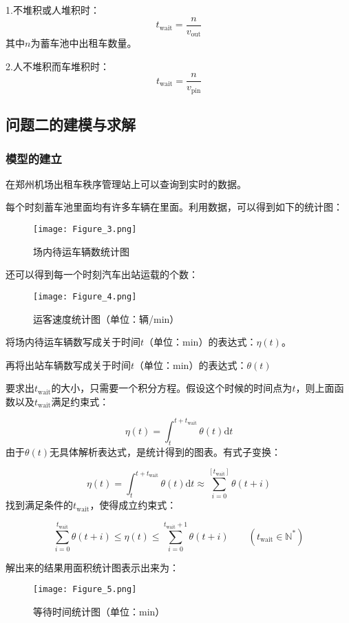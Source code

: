 \documentclass[withoutpreface,bwprint]{cumcmthesis} %
\begin{document}
1.不堆积或人堆积时：
\begin{equation}
	t_{\mathrm{wait}}=\frac{n}{v_{\mathrm{out}}}
\end{equation}
其中$n$为蓄车池中出租车数量。

2.人不堆积而车堆积时：
\begin{equation}
	t_{\mathrm{wait}}=\frac{n}{v_{\mathrm{pin}}}
\end{equation}

\newpage
\subsection{问题二的建模与求解}
\subsubsection{模型的建立}

在郑州机场出租车秩序管理站上可以查询到实时的数据。\par
每个时刻蓄车池里面均有许多车辆在里面。利用数据，可以得到如下的统计图：\par
\begin{figure}[!h]
	\centering
	\texttt{[image: Figure\_3.png]}
	\caption{场内待运车辆数统计图}
\end{figure}
还可以得到每一个时刻汽车出站运载的个数：\par
\begin{figure}[!h]
	\centering
	\texttt{[image: Figure\_4.png]}
	\caption{运客速度统计图（单位：辆/min）}
\end{figure}

将场内待运车辆数写成关于时间$t$（单位：min）的表达式：$\eta(t)$。\par
再将出站车辆数写成关于时间$t$（单位：min）的表达式：$\theta(t)$\par
要求出$t_{\mathrm{wait}}$的大小，只需要一个积分方程。假设这个时候的时间点为$t$，则上面函数以及$t_{\mathrm{wait}}$满足约束式：\par
\begin{equation}
	\eta(t)=\int_{t}^{t+t_{\mathrm{wait}}}\theta(t)\mathrm dt
\end{equation}
由于$\theta(t)$无具体解析表达式，是统计得到的图表。有式子变换：\par
\begin{equation}
	\eta(t)=\int_{t}^{t+t_{\mathrm{wait}}}\theta(t)\mathrm dt\approx \sum_{i=0}^{[t_{\mathrm{wait}}]}{\theta(t+i)}
\end{equation}
找到满足条件的$t_{\mathrm{wait}}$，使得成立约束式：\par
\begin{equation}
	\sum_{i=0}^{t_{\mathrm{wait}}}{\theta(t+i)}\leq\eta(t) \leq\sum_{i=0}^{t_{\mathrm{wait}}+1}{\theta(t+i)}\quad\quad ( t_{\mathrm{wait}}\in \mathbb{N}^*)
\end{equation}\par
解出来的结果用面积统计图表示出来为：\par
\begin{figure}[!h]
	\centering
	\texttt{[image: Figure\_5.png]}
	\caption{等待时间统计图（单位：min）}
\end{figure}
\end{document}
